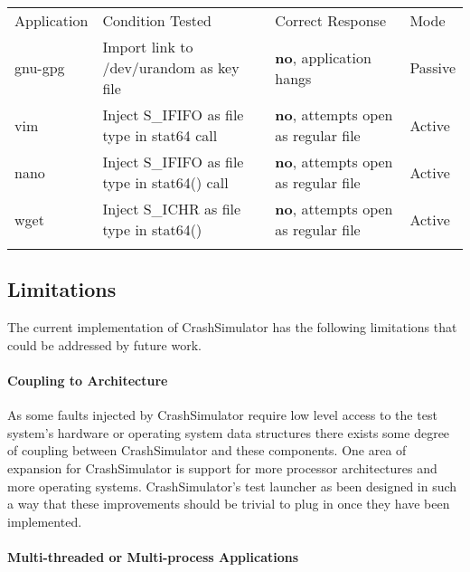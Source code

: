             \begin{table}[H]
                \scriptsize{}
                \begin{tabular}{l  l  l  | l}
                \toprule{}
                  Application & Condition Tested & Correct Response & Mode\\
                  gnu-gpg & Import link to /dev/urandom as key file & \textbf{no}, application hangs & Passive\\
                  vim & Inject S\_IFIFO as file type in stat64 call & \textbf{no}, attempts open as regular file & Active\\
                  nano & Inject S\_IFIFO as file type in stat64() call & \textbf{no}, attempts open as regular file & Active\\
                  wget & Inject S\_ICHR as file type in stat64() & \textbf{no}, attempts open as regular file & Active\\
                \bottomrule{}
                \end{tabular}
            \end{table}


    \subsection{Limitations}

        The current implementation of CrashSimulator has the following limitations that could be addressed by future work.

        \paragraph{Coupling to Architecture}

        As some faults injected by CrashSimulator require low level access to the test system's hardware or operating
        system data structures there exists some degree of coupling between CrashSimulator and these components. One
        area of expansion for CrashSimulator is support for more processor architectures and more operating systems.
        CrashSimulator's test launcher as been designed in such a way that these improvements should be trivial to plug
        in once they have been implemented.

        \paragraph{Multi-threaded or Multi-process Applications}

